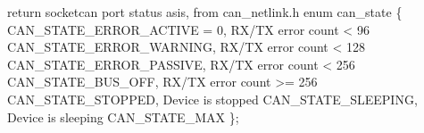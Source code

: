 \documentclass[a4paper,10pt,english]{sphinxmanual}
\begin{document}
\begin{fulllineitems}
\begin{fulllineitems}
\begin{description}
\begin{itemize}
\end{itemize}

\end{description}


\end{fulllineitems}


\begin{fulllineitems}
\label{\detokenize{classestracing:_CPPv4N12CSockCanScan13getPortStatusEv}}%
\pysigstartmultiline
{}%
\pysigstopmultiline
return socketcan port status as\sphinxhyphen{}is, from can\_netlink.h enum can\_state \{ CAN\_STATE\_ERROR\_ACTIVE = 0, RX/TX error count \textless{} 96 CAN\_STATE\_ERROR\_WARNING, RX/TX error count \textless{} 128 CAN\_STATE\_ERROR\_PASSIVE, RX/TX error count \textless{} 256 CAN\_STATE\_BUS\_OFF, RX/TX error count \textgreater{}= 256 CAN\_STATE\_STOPPED, Device is stopped CAN\_STATE\_SLEEPING, Device is sleeping CAN\_STATE\_MAX \}; 

\end{fulllineitems}


\end{fulllineitems}

\end{document}
